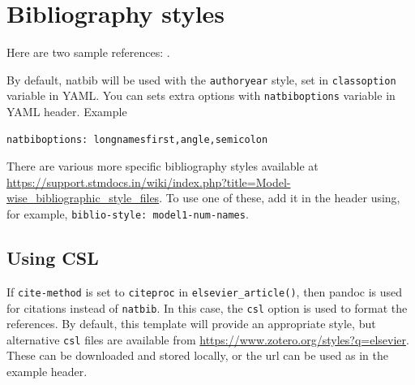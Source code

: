 \documentclass[
  super,
  preprint,
  3p]{elsarticle}
\begin{document}
\hypertarget{bibliography-styles}{%
\section{Bibliography styles}\label{bibliography-styles}}

Here are two sample references: \citet{Feynman1963118}
\citet{Dirac1953888}.

By default, natbib will be used with the \texttt{authoryear} style, set
in \texttt{classoption} variable in YAML. You can sets extra options
with \texttt{natbiboptions} variable in YAML header. Example

\begin{verbatim}
natbiboptions: longnamesfirst,angle,semicolon
\end{verbatim}

There are various more specific bibliography styles available at
\url{https://support.stmdocs.in/wiki/index.php?title=Model-wise_bibliographic_style_files}.
To use one of these, add it in the header using, for example,
\texttt{biblio-style:\ model1-num-names}.

\hypertarget{using-csl}{%
\subsection{Using CSL}\label{using-csl}}

If \texttt{cite-method} is set to \texttt{citeproc} in
\texttt{elsevier\_article()}, then pandoc is used for citations instead
of \texttt{natbib}. In this case, the \texttt{csl} option is used to
format the references. By default, this template will provide an
appropriate style, but alternative \texttt{csl} files are available from
\url{https://www.zotero.org/styles?q=elsevier}. These can be downloaded
and stored locally, or the url can be used as in the example header.


  
\end{document}

